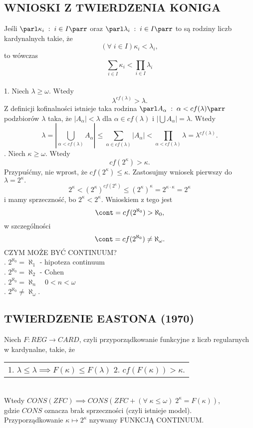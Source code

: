 \subsection{WNIOSKI Z TWIERDZENIA KONIGA}
Jeśli $\parl\kappa_i\;:\;i\in I\parr$ oraz $\parl \lambda_i\;:\;i\in I\parr$ to są rodziny liczb kardynalnych takie, że
$$(\forall\;i\in I)\kappa_i<\lambda_i,$$
to wówczas
$$\sum\limits_{i\in I}\kappa_i<\prod\limits_{i\in I}\lambda_i$$
\bigskip\\
1. Niech $\lambda\geq \omega$. Wtedy
$$\lambda^{cf(\lambda)}>\lambda.$$
\dowod
Z definicji kofinalności istnieje taka rodzina $\parl A_\alpha\;:\;\alpha<cf(\lambda)\parr$ podzbiorów $\lambda$ taka, że $|A_\alpha|<\lambda$ dla $\alpha\in cf(\lambda)$ i $|\bigcup A_\alpha|=\lambda.$ Wtedy
$$\lambda=|\bigcup\limits_{\alpha<cf(\lambda)}A_\alpha|\leq \sum\limits_{\alpha\in cf(\lambda)}|A_\alpha|<\prod\limits_{\alpha<cf(\lambda)}\lambda=\lambda^{cf(\lambda)}.$$
. Niech $\kappa\geq\omega$. Wtedy
$$cf(2^\kappa)>\kappa.$$
\dowod
Przypuśćmy, nie wprost, że $cf(2^\kappa)\leq\kappa$. Zastosujmy wniosek pierwszy do $\lambda=2^\kappa.$
$$2^\kappa<(2^\kappa)^{cf(2^\kappa)}\leq(2^\kappa)^\kappa=2^{\kappa\cdot\kappa}=2^\kappa$$
i mamy sprzeczność, bo $2^\kappa<2^\kappa$.
\kondow
Wnioskiem z tego jest
$$\cont=cf(2^{\aleph_0})>\aleph_0,$$
w szczególności
$$\cont=cf(2^{\aleph_0})\neq\aleph_\omega.$$
{\large\color{def}CZYM MOŻE BYĆ CONTINUUM?}\medskip\\
. $2^{\aleph_0}=\aleph_1$ - hipoteza continuum\medskip\\
. $2^{\aleph_0}=\aleph_2$ - Cohen\medskip\\
. $2^{\aleph_0}=\aleph_n\quad 0<n<\omega$\medskip\\
. $2^{\aleph_0}\neq\aleph_\omega$.

\subsection{TWIERDZENIE EASTONA (1970)}
\begin{center}\large
    Niech $F: REG\to CARD$, czyli przyporządkowanie funkcyjne z liczb regularnych w kardynalne, takie, że\smallskip\\
    \begin{tabular} { c }
    \makecell[l]{1. $\lambda\leq\lambda\implies F(\kappa)\leq F(\lambda)$  \\
    2. $cf(F(\kappa))>\kappa$.}
    \end{tabular}
    \medskip\\
    Wtedy $CONS(ZFC)\implies CONS(ZFC+(\forall\;\kappa\leq\omega)\;2^\kappa=F(\kappa))$, \\gdzie $CONS$ oznacza brak sprzeczności (czyli istnieje model).\medskip\\
    Przyporządkowanie $\kappa\mapsto 2^\kappa$ nzywamy {\color{def}FUNKCJĄ CONTINUUM}.
\end{center}

